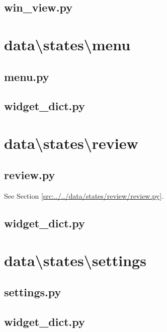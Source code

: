 \documentclass[../main/main.tex]{subfiles}
\begin{document}
\subsection{win\_view.py}

\label{src:data/states/game/mvc/win_view.py}

\section{data\textbackslash states\textbackslash menu}
\subsection{menu.py}

\label{src:data/states/menu/menu.py}

\subsection{widget\_dict.py}

\label{src:data/states/menu/widget_dict.py}

\section{data\textbackslash states\textbackslash review}
\subsection{review.py}
See Section \ref{src:../../data/states/review/review.py}.

\subsection{widget\_dict.py}

\label{src:data/states/review/widget_dict.py}

\section{data\textbackslash states\textbackslash settings}
\subsection{settings.py}

\label{src:data/states/settings/settings.py}

\subsection{widget\_dict.py}

\label{src:data/states/settings/widget_dict.py}
\end{document}
